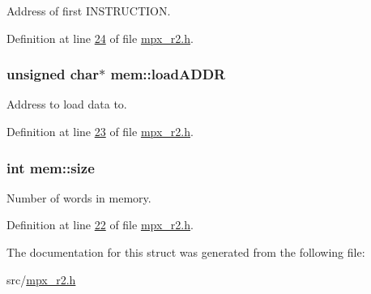 Address of first INSTRUCTION. 



Definition at line \hyperlink{mpx__r2_8h_source_l00024}{24} of file \hyperlink{mpx__r2_8h_source}{mpx\_\-r2.h}.

\hypertarget{structmem_a8f5a4db03ee0560e6bd4dd602ad753c0}{
\subsubsection[{loadADDR}]{\setlength{\rightskip}{0pt plus 5cm}unsigned char$\ast$ {\bf mem::loadADDR}}}
\label{structmem_a8f5a4db03ee0560e6bd4dd602ad753c0}


Address to load data to. 



Definition at line \hyperlink{mpx__r2_8h_source_l00023}{23} of file \hyperlink{mpx__r2_8h_source}{mpx\_\-r2.h}.

\hypertarget{structmem_a2f6285207fccce5cfe6a24037bd780c3}{
\subsubsection[{size}]{\setlength{\rightskip}{0pt plus 5cm}int {\bf mem::size}}}
\label{structmem_a2f6285207fccce5cfe6a24037bd780c3}


Number of words in memory. 



Definition at line \hyperlink{mpx__r2_8h_source_l00022}{22} of file \hyperlink{mpx__r2_8h_source}{mpx\_\-r2.h}.



The documentation for this struct was generated from the following file:\begin{DoxyCompactItemize}
\item 
src/\hyperlink{mpx__r2_8h}{mpx\_\-r2.h}\end{DoxyCompactItemize}
